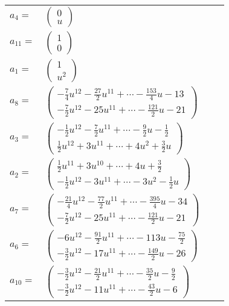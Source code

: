 \documentclass[1p]{elsarticle_modified}
\theoremstyle{definition}
\begin{document}
\begin{tabular}{m{7pt} m{180pt} m{7pt} m{180pt} }
\flushright $a_{4}=$&$\begin{pmatrix}0\\u\end{pmatrix}$ \\
\flushright $a_{11}=$&$\begin{pmatrix}1\\0\end{pmatrix}$ \\
\flushright $a_{1}=$&$\begin{pmatrix}1\\u^2\end{pmatrix}$ \\
\flushright $a_{8}=$&$\begin{pmatrix}-\frac{7}{4} u^{12}-\frac{27}{2} u^{11}+\cdots-\frac{153}{4} u-13\\-\frac{7}{2} u^{12}-25 u^{11}+\cdots-\frac{121}{2} u-21\end{pmatrix}$ \\
\flushright $a_{3}=$&$\begin{pmatrix}-\frac{1}{2} u^{12}-\frac{7}{2} u^{11}+\cdots-\frac{9}{2} u-\frac{1}{2}\\\frac{1}{2} u^{12}+3 u^{11}+\cdots+4 u^2+\frac{3}{2} u\end{pmatrix}$ \\
\flushright $a_{2}=$&$\begin{pmatrix}\frac{1}{2} u^{11}+3 u^{10}+\cdots+4 u+\frac{3}{2}\\-\frac{1}{2} u^{12}-3 u^{11}+\cdots-3 u^2-\frac{1}{2} u\end{pmatrix}$ \\
\flushright $a_{7}=$&$\begin{pmatrix}-\frac{21}{4} u^{12}-\frac{77}{2} u^{11}+\cdots-\frac{395}{4} u-34\\-\frac{7}{2} u^{12}-25 u^{11}+\cdots-\frac{121}{2} u-21\end{pmatrix}$ \\
\flushright $a_{6}=$&$\begin{pmatrix}-6 u^{12}-\frac{91}{2} u^{11}+\cdots-113 u-\frac{75}{2}\\-\frac{3}{2} u^{12}-17 u^{11}+\cdots-\frac{149}{2} u-26\end{pmatrix}$ \\
\flushright $a_{10}=$&$\begin{pmatrix}-\frac{3}{2} u^{12}-\frac{21}{2} u^{11}+\cdots-\frac{35}{2} u-\frac{9}{2}\\-\frac{3}{2} u^{12}-11 u^{11}+\cdots-\frac{43}{2} u-6\end{pmatrix}$ \\

\end{tabular}
\end{document}
